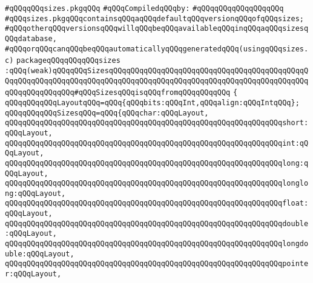 \label{src/lib/c-kit/src/ast/sizes.pkg}
\verb|#qQQqqQQqsizes.pkgqQQq|\newline
\newline
\verb|#qQQqCompiledqQQqby:|\newline
\verb|#qQQqqQQqqQQqqQQqqQQq|\newline
\newline
\verb|#qQQqsizes.pkgqQQqcontainsqQQqaqQQqdefaultqQQqversionqQQqofqQQqsizes;|\newline
\verb|#qQQqotherqQQqversionsqQQqwillqQQqbeqQQqavailableqQQqinqQQqaqQQqsizesqQQqdatabase,|\newline
\verb|#qQQqorqQQqcanqQQqbeqQQqautomaticallyqQQqgeneratedqQQq(usingqQQqsizes.c)|\newline
\newline
\verb|packageqQQqqQQqqQQqsizes|\newline
\verb|:qQQq(weak)qQQqqQQqSizesqQQqqQQqqQQqqQQqqQQqqQQqqQQqqQQqqQQqqQQqqQQqqQQqqQQqqQQqqQQqqQQqqQQqqQQqqQQqqQQqqQQqqQQqqQQqqQQqqQQqqQQqqQQqqQQqqQQqqQQqqQQqqQQqqQQq#qQQqSizesqQQqisqQQqfromqQQqqQQqqQQq|\newline
\verb|{|\newline
\verb|qQQqqQQqqQQqLayoutqQQq=qQQq{qQQqbits:qQQqInt,qQQqalign:qQQqIntqQQq};|\newline
\verb|qQQqqQQqqQQqSizesqQQq=qQQq{qQQqchar:qQQqLayout,|\newline
\verb|qQQqqQQqqQQqqQQqqQQqqQQqqQQqqQQqqQQqqQQqqQQqqQQqqQQqqQQqqQQqqQQqshort:qQQqLayout,|\newline
\verb|qQQqqQQqqQQqqQQqqQQqqQQqqQQqqQQqqQQqqQQqqQQqqQQqqQQqqQQqqQQqqQQqint:qQQqLayout,|\newline
\verb|qQQqqQQqqQQqqQQqqQQqqQQqqQQqqQQqqQQqqQQqqQQqqQQqqQQqqQQqqQQqqQQqlong:qQQqLayout,|\newline
\verb|qQQqqQQqqQQqqQQqqQQqqQQqqQQqqQQqqQQqqQQqqQQqqQQqqQQqqQQqqQQqqQQqlonglong:qQQqLayout,|\newline
\verb|qQQqqQQqqQQqqQQqqQQqqQQqqQQqqQQqqQQqqQQqqQQqqQQqqQQqqQQqqQQqqQQqfloat:qQQqLayout,|\newline
\verb|qQQqqQQqqQQqqQQqqQQqqQQqqQQqqQQqqQQqqQQqqQQqqQQqqQQqqQQqqQQqqQQqdouble:qQQqLayout,|\newline
\verb|qQQqqQQqqQQqqQQqqQQqqQQqqQQqqQQqqQQqqQQqqQQqqQQqqQQqqQQqqQQqqQQqlongdouble:qQQqLayout,|\newline
\verb|qQQqqQQqqQQqqQQqqQQqqQQqqQQqqQQqqQQqqQQqqQQqqQQqqQQqqQQqqQQqqQQqpointer:qQQqLayout,|\newline
